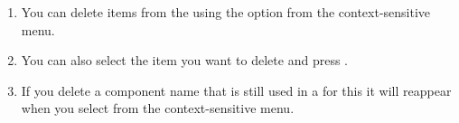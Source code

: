 \begin{enumerate}
\item You can delete items from the \gdomeditor using the  option from the context-sensitive menu.
\item You can also select the item you want to delete and press .
\item If you delete a component name that is still used in a \gdcase{} for this \gdsuite{}  it will reappear  when you select  from the context-sensitive menu.
\end{enumerate}
